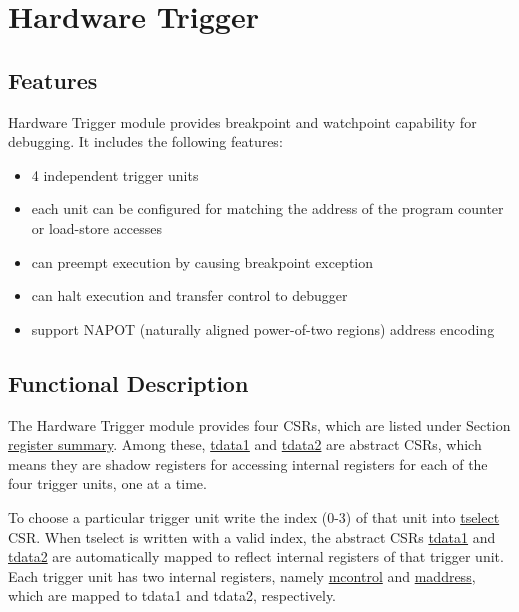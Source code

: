 \documentclass[main\_\_EN.tex]{subfiles}
\begin{document}



\clearpage
\section{Hardware Trigger}
\label{sec:riscvcpu-hwt}


\subsection{Features}
\label{sec:riscvcpu-hwt-features}

Hardware Trigger module provides breakpoint and watchpoint capability for debugging. It includes the following features:

\begin{itemize}
    \item 4 independent trigger units
    \item each unit can be configured for matching the address of the program counter or load-store accesses
    \item can preempt execution by causing breakpoint exception
    \item can halt execution and transfer control to debugger
    \item support NAPOT (naturally aligned power-of-two regions) address encoding
\end{itemize}

\subsection{Functional Description}
\label{sec:riscvcpu-hwt-func-descr}

The Hardware Trigger module provides four CSRs, which are listed under Section \hyperref[sec:riscvcpu-hwt-reg-summ]{register summary}. Among these, \hyperref[regdesc:TDATA1]{tdata1} and \hyperref[regdesc:TDATA2]{tdata2} are abstract CSRs, which means they are shadow registers for accessing internal registers for each of the four trigger units, one at a time.

To choose a particular trigger unit write the index (0-3) of that unit into \hyperref[regdesc:TSELECT]{tselect} CSR. When tselect is written with a valid index, the abstract CSRs \hyperref[regdesc:TDATA1]{tdata1} and \hyperref[regdesc:TDATA2]{tdata2} are automatically mapped to reflect internal registers of that trigger unit. Each trigger unit has two internal registers, namely \hyperref[regdesc:MCONTROL]{mcontrol} and \hyperref[regdesc:MADDRESS]{maddress}, which are mapped to tdata1 and tdata2, respectively.
\end{document}
